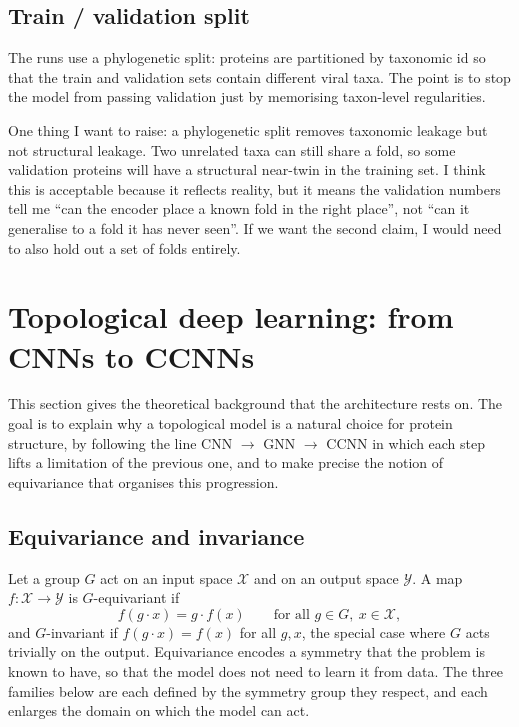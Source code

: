 \documentclass[11pt,a4paper]{article}
\theoremstyle{definition}
\begin{document}
\subsection{Train / validation split}

The runs use a phylogenetic split: proteins are partitioned by taxonomic id so
that the train and validation sets contain different viral taxa. The point is to
stop the model from passing validation just by memorising taxon-level
regularities.

One thing I want to raise: a phylogenetic split removes taxonomic leakage but not
structural leakage. Two unrelated taxa can still share a fold, so some validation
proteins will have a structural near-twin in the training set. I think this is
acceptable because it reflects reality, but it means the validation numbers tell
me ``can the encoder place a known fold in the right place'', not ``can it
generalise to a fold it has never seen''. If we want the second claim, I would
need to also hold out a set of folds entirely.

\section{Topological deep learning: from CNNs to CCNNs}

This section gives the theoretical background that the architecture rests on. The
goal is to explain why a topological model is a natural choice for protein
structure, by following the line CNN $\to$ GNN $\to$ CCNN in which each step lifts
a limitation of the previous one, and to make precise the notion of equivariance
that organises this progression.

\subsection{Equivariance and invariance}

Let a group $G$ act on an input space $\mathcal{X}$ and on an output space
$\mathcal{Y}$. A map $f:\mathcal{X}\to\mathcal{Y}$ is $G$-equivariant if
\[
 f(g\cdot x)=g\cdot f(x)\qquad\text{for all }g\in G,\ x\in\mathcal{X},
\]
and $G$-invariant if $f(g\cdot x)=f(x)$ for all $g,x$, the special case where $G$
acts trivially on the output. Equivariance encodes a symmetry that the problem is
known to have, so that the model does not need to learn it from data. The three
families below are each defined by the symmetry group they respect, and each
enlarges the domain on which the model can act.
\end{document}
